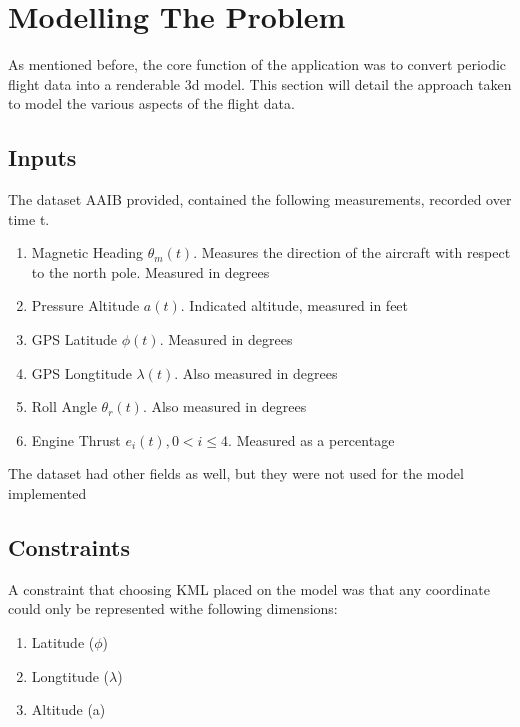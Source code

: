 
\chapter{Modelling The Problem} %

\label{ch:model} %

As mentioned before, the core function of the application was to convert periodic flight data into a
renderable 3d model. This section will detail the approach taken to model the various aspects of the flight data.\\


\section{Inputs}

The dataset AAIB provided, contained the following measurements, recorded over time t.
\begin{enumerate}
  \item Magnetic Heading $\theta_{m}(t)$. Measures the direction of the aircraft with respect to the north pole. Measured in degrees
  \item Pressure Altitude $a(t)$. Indicated altitude, measured in feet
  \item GPS Latitude $\phi(t)$. Measured in degrees
  \item GPS Longtitude $\lambda(t)$. Also measured in degrees
  \item Roll Angle $\theta_{r}(t)$. Also measured in degrees
  \item Engine Thrust $e_{i}(t), 0 < i \leq 4$. Measured as a percentage
\end{enumerate}

The dataset had other fields as well, but they were not used for the model implemented

\section{Constraints}

A constraint that choosing KML placed on the model was that any coordinate could only be represented withe following dimensions:
\begin{enumerate}
\item Latitude ($\phi$)
\item Longtitude ($\lambda$)
\item Altitude (a)
\end{enumerate}

